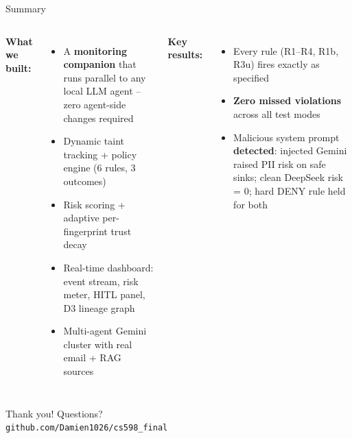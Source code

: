 \documentclass[aspectratio=169]{beamer}
\begin{document}
\begin{frame}{Summary}
  \small
  \begin{columns}[T]
    \textbf{What we built:}
    \begin{itemize}
      \item A \textbf{monitoring companion} that runs parallel to any
            local LLM agent -- zero agent-side changes required
      \item Dynamic taint tracking + policy engine (6 rules, 3 outcomes)
      \item Risk scoring + adaptive per-fingerprint trust decay
      \item Real-time dashboard: event stream, risk meter, HITL panel,
            D3 lineage graph
      \item Multi-agent Gemini cluster with real email + RAG sources
    \end{itemize}

    \pause
    \textbf{Key results:}
    \begin{itemize}
      \item Every rule (R1--R4, R1b, R3u) fires exactly as specified
      \item \textbf{Zero missed violations} across all test modes
      \item Malicious system prompt \textbf{detected}: injected Gemini
            raised PII risk on safe sinks; clean DeepSeek risk = 0;
            hard DENY rule held for both
    \end{itemize}
  \end{columns}

  \vspace{0.1em}
  \begin{center}
    \large Thank you! \quad Questions?\\[0.1em]
    \normalsize\texttt{github.com/Damien1026/cs598\_final}
  \end{center}
\end{frame}
\end{document}
